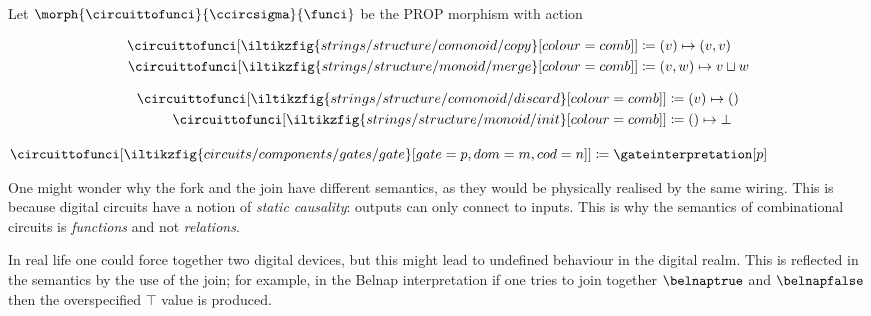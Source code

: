 \documentclass{lmcs}
\begin{document}
\begin{defi}
    Let \(\morph{\circuittofunci}{\ccircsigma}{\funci}\) be the PROP morphism
    with action%
    \vspace{-\abovedisplayskip}
    \begin{center}
        \begin{minipage}{0.32\textwidth}
            \centering
            \begin{align*}
                \circuittofunci[
                    \iltikzfig{strings/structure/comonoid/copy}[colour=comb]
                ]
                 & \coloneqq
                (v) \mapsto (v, v)
                \\
                \circuittofunci[
                    \iltikzfig{strings/structure/monoid/merge}[colour=comb]
                ]
                 & \coloneqq
                (v, w) \mapsto v \sqcup w
            \end{align*}
        \end{minipage}
        \quad
        \begin{minipage}{0.25\textwidth}
            \centering
            \begin{align*}
                \circuittofunci[
                    \iltikzfig{strings/structure/comonoid/discard}[colour=comb]
                ]
                 & \coloneqq
                (v) \mapsto ()
                \\
                \circuittofunci[
                    \iltikzfig{strings/structure/monoid/init}[colour=comb]
                ]
                 & \coloneqq
                () \mapsto \bot
            \end{align*}
        \end{minipage}
        \quad
        \begin{minipage}{0.25\textwidth}
            \centering
            \vspace{1.5em}
            \(\circuittofunci[
                \iltikzfig{circuits/components/gates/gate}[gate=p,dom=m,cod=n]
            ]
            \coloneqq
            \gateinterpretation[p]
            \)
        \end{minipage}
    \end{center}
\end{defi}

\begin{rem}
    One might wonder why the fork and the join have different semantics, as they
    would be physically realised by the same wiring.
    This is because digital circuits have a notion of \emph{static causality}:
    outputs can only connect to inputs.
    This is why the semantics of combinational circuits is \emph{functions} and
    not \emph{relations}.

    In real life one could force together two digital devices, but this might
    lead to undefined behaviour in the digital realm.
    This is reflected in the semantics by the use of the join; for example, in
    the Belnap interpretation if one tries to join together \(\belnaptrue\) and
    \(\belnapfalse\) then the overspecified \(\top\) value is produced.
\end{rem}
\end{document}
